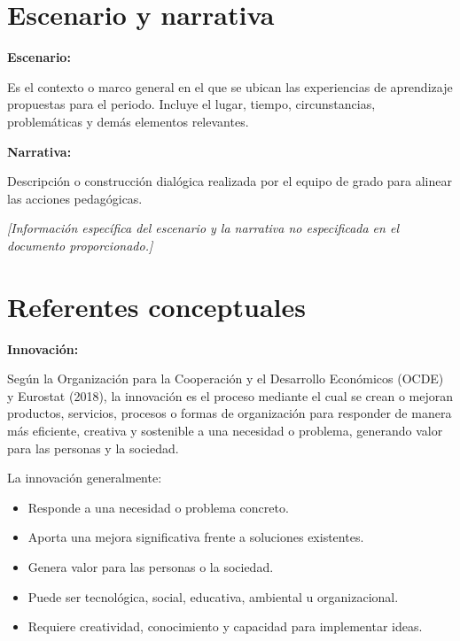\documentclass[12pt,a4paper]{article}
\newcommand{\placeholder}[1]{
	\textit{\textcolor{secondary}{[#1]}}
}
\begin{document}
	
	\section{Escenario y narrativa}
	
	\textbf{Escenario:}
	
	Es el contexto o marco general en el que se ubican las experiencias
	de aprendizaje propuestas para el periodo. Incluye el lugar, tiempo,
	circunstancias, problemáticas y demás elementos relevantes.
	
	\textbf{Narrativa:}
	
	Descripción o construcción dialógica realizada por el equipo de grado
	para alinear las acciones pedagógicas.
	
	\placeholder{Información específica del escenario y la narrativa no especificada
		en el documento proporcionado.}
	
	
	\section{Referentes conceptuales}
	
	\textbf{Innovación:}
	
	Según la Organización para la Cooperación y el Desarrollo Económicos
	(OCDE) y Eurostat (2018), la innovación es el proceso mediante el cual
	se crean o mejoran productos, servicios, procesos o formas de
	organización para responder de manera más eficiente, creativa y
	sostenible a una necesidad o problema, generando valor para las
	personas y la sociedad.
	
	La innovación generalmente:
	
	\begin{itemize}
		
		\item Responde a una necesidad o problema concreto.
		
		\item Aporta una mejora significativa frente a soluciones existentes.
		
		\item Genera valor para las personas o la sociedad.
		
		\item Puede ser tecnológica, social, educativa, ambiental u
		organizacional.
		
		\item Requiere creatividad, conocimiento y capacidad para
		implementar ideas.
		
	\end{itemize}
	
\end{document}
